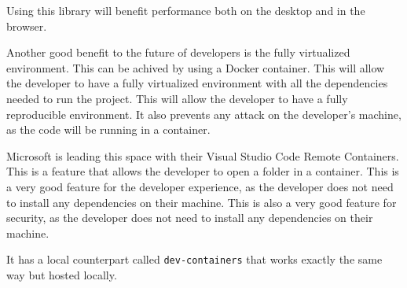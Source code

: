 \documentclass[12pt, letterpaper]{article}
\begin{document}
\begin{multicols}{2}
    Using this library will benefit performance both on the desktop and in the browser.

    Another good benefit to the future of developers is the fully virtualized environment. This can be achived by using a Docker container. This will allow the developer to have a fully virtualized environment with all the dependencies needed to run the project. This will allow the developer to have a fully reproducible environment. It also prevents any attack on the developer's machine, as the code will be running in a container.

    Microsoft is leading this space with their Visual Studio Code Remote Containers. This is a feature that allows the developer to open a folder in a container. This is a very good feature for the developer experience, as the developer does not need to install any dependencies on their machine. This is also a very good feature for security, as the developer does not need to install any dependencies on their machine.

    It has a local counterpart called \verb|dev-containers| that works exactly the same way but hosted locally.


\end{multicols}
\end{document}
